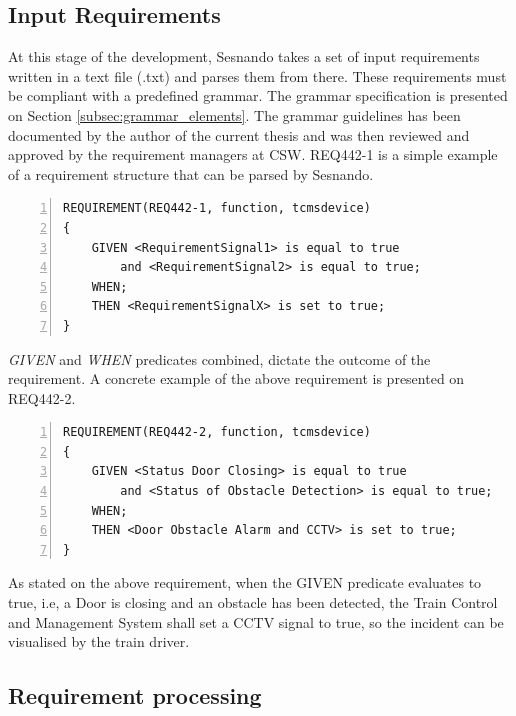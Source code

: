 \subsection{Input Requirements}
\label{subsec:sesnando_input}

At this stage of the development, Sesnando takes a set of input requirements written in a text file (.txt) and parses them from there. These requirements must be compliant with a predefined grammar. The grammar specification is presented on Section \ref{subsec:grammar_elements}. The grammar guidelines \cite{sesnando-req-guidelines} has been documented by the author of the current thesis and was then reviewed and approved by the requirement managers at CSW. REQ442-1 is a simple example of a requirement structure that can be parsed by Sesnando.\\


\begin{Verbatim}[xleftmargin=12mm, numbers=left]
REQUIREMENT(REQ442-1, function, tcmsdevice) 
{
	GIVEN <RequirementSignal1> is equal to true
	    and <RequirementSignal2> is equal to true;
	WHEN;
	THEN <RequirementSignalX> is set to true;
}
\end{Verbatim}


\textit{GIVEN} and \textit{WHEN} predicates combined, dictate the outcome of the requirement. A concrete example of the above requirement is presented on REQ442-2.\\


\begin{Verbatim}[xleftmargin=12mm, numbers=left]
REQUIREMENT(REQ442-2, function, tcmsdevice) 
{
	GIVEN <Status Door Closing> is equal to true
	    and <Status of Obstacle Detection> is equal to true;
	WHEN;
	THEN <Door Obstacle Alarm and CCTV> is set to true;
}
\end{Verbatim}

As stated on the above requirement, when the GIVEN predicate evaluates to true, i.e, a Door is closing and an obstacle has been detected, the Train Control and Management System shall set a CCTV signal to true, so the incident can be visualised by the train driver.


\subsection{Requirement processing}
\label{subsec:requirement_processing}

